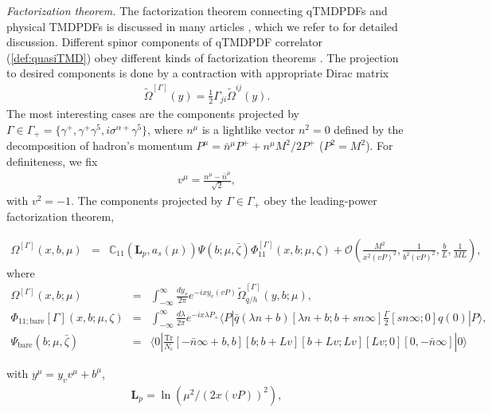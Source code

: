 \documentclass[aps,prl,twocolumn,secnumarabic,notitlepage,superscriptaddress,nofootinbib,tightenlines,floatfix,preprintnumbers]{revtex4-1}
\renewcommand{\(}{\left(}
\renewcommand{\)}{\right)}
\renewcommand{\[}{\left[}
\renewcommand{\]}{\right]}
\begin{document}
\textit{Factorization theorem.} The factorization theorem connecting qTMDPDFs and physical TMDPDFs is discussed in many articles \cite{Ebert:2019tvc, Ji:2019sxk, Ji:2019ewn, Vladimirov:2020ofp, Ebert:2020gxr, Ebert:2022fmh, Rodini:2022wic}, which we refer to for detailed discussion. Different spinor components of qTMDPDF correlator (\ref{def:quasiTMD}) obey different kinds of factorization theorems \cite{Rodini:2022wki}. The projection to desired components is done by a contraction with appropriate Dirac matrix
\begin{eqnarray}
\widetilde{\Omega}^{[\Gamma]}(y)=\frac{1}{2}\Gamma_{ji}\widetilde{\Omega}^{ij}(y).
\end{eqnarray}
The most interesting cases are the components projected by $\Gamma\in\Gamma_+ =\{\gamma^+,\gamma^+\gamma^5, i\sigma^{\alpha +}\gamma^5\}$, where $n^\mu$ is a lightlike vector $n^2=0$ defined by the decomposition of hadron's momentum $P^\mu=\bar n^\mu P^++n^\mu M^2/2P^+$ ($P^2=M^2$). For definiteness, we fix
\begin{eqnarray}
v^\mu=\frac{n^\mu-\bar n^\mu}{\sqrt{2}},
\end{eqnarray}
with $v^2=-1$. The components projected by $\Gamma\in\Gamma_+$ obey the leading-power factorization theorem, 
\begin{widetext}
\begin{eqnarray}
\label{factorization}
\Omega^{[\Gamma]}(x,b,\mu)&=&\mathbb{C}_{11}(\mathbf{L}_p,a_s(\mu))\Psi(b;\mu,\bar \zeta)\Phi_{11}^{[\Gamma]}(x,b;\mu,\zeta)
+\mathcal{O}\(\frac{M^2}{x^2(vP)^2},\frac{1}{b^2(vP)^2},\frac{b}{L},\frac{1}{ML}\),
\end{eqnarray}
where
\begin{eqnarray}
\Omega^{[\Gamma]}(x,b;\mu)&=&\int_{-\infty}^{\infty} \frac{dy_v}{2\pi} e^{-ix y_v(vP)}
\widetilde{\Omega}^{[\Gamma]}_{q/h}(y,b; \mu),
\\
\Phi_{11;\text{bare}}{[\Gamma]}(x,b;\mu,\zeta)&=&
\int_{-\infty}^{\infty} \frac{d\lambda}{2\pi} e^{-ix \lambda P_+}
\langle P|\bar{q}(\lambda n+b) [\lambda n+b; b+sn\infty ]\frac{\Gamma}{2}[sn\infty;0]q(0)|P\rangle,
\\
\Psi_{\text{bare}}(b;\mu,\bar \zeta)&=&
\langle 0| \frac{\text{Tr}}{N_c}[-\bar n\infty+b,b][b; b+Lv][b+Lv;Lv][Lv;0][0,-\bar n \infty]|0\rangle
\end{eqnarray}
\end{widetext}
with $y^\mu=y_v v^\mu +b^\mu$, 
\begin{eqnarray}\label{Lp}
\mathbf{L}_p=\ln(\mu^2/(2x(vP))^2),    
\end{eqnarray}
\end{document}
